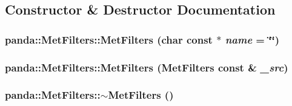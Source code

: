\subsection{Constructor \& Destructor Documentation}
\hypertarget{classpanda_1_1MetFilters_a165bae4810eedbd7fdee7259382398cf}{
\subsubsection[{MetFilters}]{\setlength{\rightskip}{0pt plus 5cm}panda::MetFilters::MetFilters (char const $\ast$ {\em name} = {\ttfamily \char`\"{}\char`\"{}})}}
\label{classpanda_1_1MetFilters_a165bae4810eedbd7fdee7259382398cf}
\hypertarget{classpanda_1_1MetFilters_a2b0fb3d488715124a4bb61c4369fdb4b}{
\subsubsection[{MetFilters}]{\setlength{\rightskip}{0pt plus 5cm}panda::MetFilters::MetFilters ({\bf MetFilters} const \& {\em \_\-src})}}
\label{classpanda_1_1MetFilters_a2b0fb3d488715124a4bb61c4369fdb4b}
\hypertarget{classpanda_1_1MetFilters_a39343453635116981e0f1e8685333897}{
\subsubsection[{$\sim$MetFilters}]{\setlength{\rightskip}{0pt plus 5cm}panda::MetFilters::$\sim$MetFilters ()}}
\label{classpanda_1_1MetFilters_a39343453635116981e0f1e8685333897}


